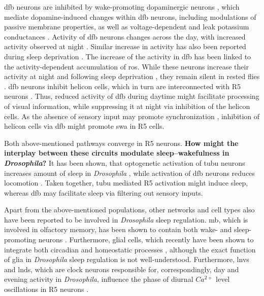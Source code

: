 \documentclass[../main.tex]{subfiles}
\begin{document}
\gls{dfb} neurons are inhibited by wake-promoting dopaminergic neurons \cite{liuTwoDopaminergicNeurons2012}, which mediate dopamine-induced changes within \gls{dfb} neurons, including modulations of passive membrane properties, as well as voltage-dependent and leak potassium conductances \cite{pimentelOperationHomeostaticSleep2016}. Activity of \gls{dfb} neurons changes across the day, with increased activity observed at night \cite{raccugliaCoherentMultilevelNetwork2022}. Similar increase in activity has also been reported during sleep deprivation \cite{pimentelOperationHomeostaticSleep2016}. The increase of the activity in \gls{dfb} has been linked to the activity-dependent accumulation of \gls{ros}.
While these neurons increase their activity at night and following sleep deprivation \cite{raccugliaCoherentMultilevelNetwork2022}, they remain silent in rested flies \cite{pimentelOperationHomeostaticSleep2016}.
\gls{dfb} neurons inhibit helicon cells, which in turn are interconnected with R5 neurons \cite{suarez-grimaltNeuralArchitectureSleep2021,raccugliaCoherentMultilevelNetwork2022,shaferRegulationDrosophilaSleep2021}.
Thus, reduced activity of \gls{dfb} during daytime might facilitate processing of visual information, while suppressing it at night via inhibition of the helicon cells. As the absence of sensory input may promote synchronization \cite{raccugliaCoherentMultilevelNetwork2022}, inhibition of helicon cells via \gls{dfb} might promote \gls{swa} in R5 cells.

Both above-mentioned pathways converge in R5 neurons. \textbf{How might the interplay between these circuits modulate sleep–wakefulness in \textit{Drosophila}?}
It has been shown, that optogenetic activation of \gls{tubu} neurons increases amount of sleep in \textit{Drosophila} \cite{lamazeWakePromotingCircadianOutput2018}, while activation of \gls{dfb} neurons reduces locomotion \cite{raccugliaCoherentMultilevelNetwork2022}. Taken together, \gls{tubu} mediated R5 activation might induce sleep, whereas \gls{dfb} may facilitate sleep via filtering out sensory inputs.

Apart from the above-mentioned populations, other networks and cell types also have been reported to be involved in \textit{Drosophila} sleep regulation. \gls{mb}, which is involved in olfactory memory, has been shown to contain both wake- and sleep-promoting neurons
\cite{suarez-grimaltNeuralArchitectureSleep2021,dubowyCircadianRhythmsSleep2017}. Furthermore, glial cells, which recently have been shown to integrate both circadian and homeostatic processes \cite{doppSinglecellTranscriptomicsReveals2024}, although the exact function of glia in \textit{Drosophila} sleep regulation is not well-understood. Furthermore,  \glspl{lnv} and \glspl{lnd}, which are clock neurons responsible for, correspondingly, day and evening activity in \textit{Drosophila}, influence the phase of diurnal $Ca^{2+}$ level oscillations in R5 neurons \cite{andreaniCircadianProgrammingEllipsoid2022,liangMorningEveningCircadian2019}.
\end{document}
